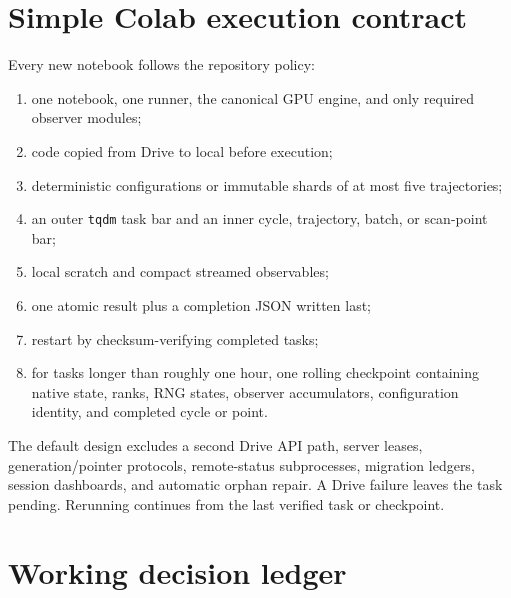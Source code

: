 \documentclass[aps,prx,twocolumn,floatfix,nofootinbib,superscriptaddress]{revtex4-2}
\newcommand{\code}[1]{\texttt{#1}}
\begin{document}
\section{Simple Colab execution contract}

Every new notebook follows the repository policy:
\begin{enumerate}
\item one notebook, one runner, the canonical GPU engine, and only required
observer modules;
\item code copied from Drive to local  before execution;
\item deterministic configurations or immutable shards of at most five
trajectories;
\item an outer \code{tqdm} task bar and an inner cycle, trajectory, batch, or
scan-point bar;
\item local scratch and compact streamed observables;
\item one atomic result plus a completion JSON written last;
\item restart by checksum-verifying completed tasks;
\item for tasks longer than roughly one hour, one rolling checkpoint containing
native state, ranks, RNG states, observer accumulators, configuration identity,
and completed cycle or point.
\end{enumerate}

The default design excludes a second Drive API path, server leases,
generation/pointer protocols, remote-status subprocesses, migration ledgers,
session dashboards, and automatic orphan repair.  A Drive failure leaves the
task pending.  Rerunning continues from the last verified task or checkpoint.

\section{Working decision ledger}
\end{document}

